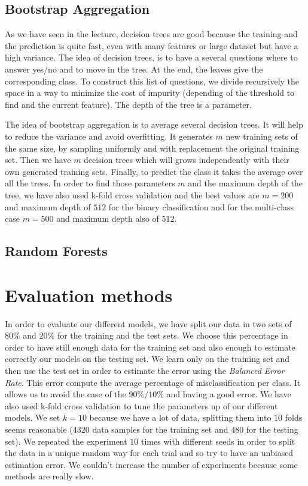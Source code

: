 \documentclass{article} %
\begin{document}
\subsection{Bootstrap Aggregation}

As we have seen in the lecture, decision trees are good because the training and the prediction is quite fast, even with many features or large dataset but have a high variance. The idea of decision trees, is to have a several questions where to answer yes/no and to move in the tree. At the end, the leaves give the corresponding class. To construct this list of questions, we divide recursively the space in a way to minimize the cost of impurity (depending of the threshold to find and the current feature). The depth of the tree is a parameter.

The idea of bootstrap aggregation is to average several decision trees. It will help to reduce the variance and avoid overfitting. It generates $m$ new training sets of the same size, by sampling uniformly and with replacement the original training set. Then we have $m$ decision trees which will grows independently with their own generated training sets. Finally, to predict the class it takes the average over all the trees. In order to find those parameters $m$ and the maximum depth of the tree, we have also used k-fold cross validation and the best values are $m = 200$ and maximum depth of $512$ for the binary classification and for the multi-class case $m = 500$ and maximum depth also of $512$.

\subsection{Random Forests}

\section{Evaluation methods}

In order to evaluate our different models, we have split our data in two sets of $80\%$ and $20\%$ for the training and the test sets. We choose this percentage in order to have still enough data for the training set and also enough to estimate correctly our models on the testing set. We learn only on the training set and then use the test set in order to estimate the error using the \textit{Balanced Error Rate}. This error compute the average percentage of misclassification per class. It allows us to avoid the case of the $90\%/10\%$ and having a good error. We have also used k-fold cross validation to tune the parameters up of our different models. We set $k=10$ because we have a lot of data, splitting them into $10$ folds seems reasonable ($4320$ data samples for the training set and $480$ for the testing set). We repeated the experiment $10$ times with different seeds in order to split the data in a unique random way for each trial and so try to have an unbiased estimation error. We couldn't increase the number of experiments because some methods are really slow.
\end{document}
